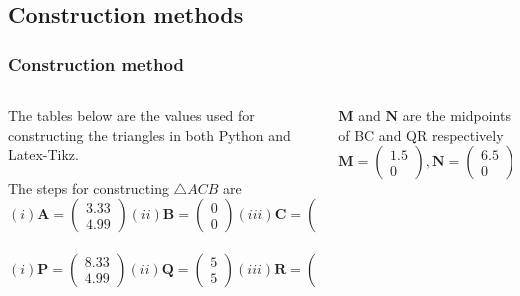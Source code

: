 \documentclass{beamer}
\renewcommand{\vec}[1]{\mathbf{#1}}
\begin{document}
\subsection*{Construction methods}
\begin{frame}[fragile]
\footnotesize
\frametitle{Construction method}
\begin{columns}
\begin{column}{0.5\textwidth}
The tables below are the values used for constructing the triangles in both Python and Latex-Tikz.
\begin{table}[htbp]
\centering
\caption{\tiny To construct $\triangle ACB$ and $\triangle PQR$}
\end{table}
The steps for constructing $\triangle ACB$ are
\newline
$$(i)\vec{A}= \begin{pmatrix}3.33\\4.99\end{pmatrix}
(ii)\vec{B}=\begin{pmatrix}0\\0\end{pmatrix}
(iii)\vec{C}=\begin{pmatrix}3\\0\end{pmatrix}$$
\\
$$(i)\vec{P}= \begin{pmatrix}8.33\\4.99\end{pmatrix}
(ii)\vec{Q}=\begin{pmatrix}5\\5\end{pmatrix}
(iii)\vec{R}=\begin{pmatrix}8\\0\end{pmatrix}$$
\end{column}
\begin{column}{0.5\textwidth}
$\vec{M}$ and $\vec{N}$ are the midpoints of BC and QR respectively 
\\
$$\vec{M}=\begin{pmatrix}1.5\\0\end{pmatrix},\vec{N}=\begin{pmatrix}6.5\\0\end{pmatrix}$$
\\


\end{column}
\end{columns}
\end{frame}
\end{document}
